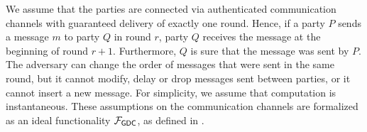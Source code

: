 We assume that the parties are connected via authenticated communication channels with guaranteed 
delivery of exactly one round. Hence, if a party $P$ sends a message $m$ to party $Q$ in round 
$r$, party $Q$ receives the message at the beginning of round $r + 1$. Furthermore, $Q$ is sure 
that the message was sent by $P$. The adversary can change the order of messages  that were sent in the same round, 
but it cannot modify, delay or drop messages sent between parties, or it cannot insert a new 
message. For simplicity, we assume that computation is instantaneous. These assumptions on the 
communication channels are formalized as an ideal functionality $\mathcal{F}_{\mathsf{GDC}}$, as defined 
in \cite{mpvsc}.


